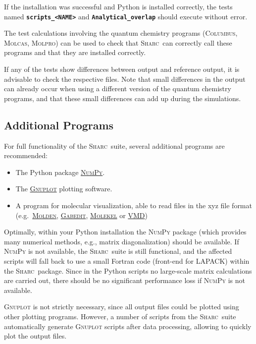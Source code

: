 \documentclass[a4paper,11pt,DIV=15,openany,twoside=false]{scrbook}
\newcommand{\sharc}{\textsc{Sharc}}
\newcommand{\ttt}[1]{\textbf{\texttt{#1}}}
\begin{document}
If the installation was successful and Python is installed correctly, the tests named \ttt{scripts\_<NAME>} and \ttt{Analytical\_overlap} should execute without error. 

The test calculations involving the quantum chemistry programs (\textsc{Columbus}, \textsc{Molcas}, \textsc{Molpro}) can be used to check that \sharc\ can correctly call these programs and that they are installed correctly.

If any of the tests show differences between output and reference output, it is advisable to check the respective files. Note that small differences in the output can already occur when using a different version of the quantum chemistry programs, and that these small differences can add up during the simulations.

\subsection{Additional Programs}

For full functionality of the \sharc\ suite, several additional programs are recommended:
\begin{itemize}
  \item The Python package \href{http://www.numpy.org/}{\textsc{NumPy}}.
  \item The \href{http://www.gnuplot.info/}{\textsc{Gnuplot}} plotting software.
  \item A program for molecular visualization, able to read files in the xyz file format (e.g.\ \href{http://www.cmbi.ru.nl/molden/molden.html}{\textsc{Molden}}, \href{http://gabedit.sourceforge.net/}{\textsc{Gabedit}}, \href{http://molekel.cscs.ch/wiki/pmwiki.php}{\textsc{Molekel}} or \href{http://www.ks.uiuc.edu/Research/vmd/}{VMD})
\end{itemize}

Optimally, within your Python installation the \textsc{NumPy} package (which provides many numerical methods, e.g., matrix diagonalization) should be available. If \textsc{NumPy} is not available, the \sharc\ suite is still functional, and the affected scripts will fall back to use a small Fortran code (front-end for LAPACK) within the \sharc\ package. Since in the Python scripts no large-scale matrix calculations are carried out, there should be no significant performance loss if \textsc{NumPy} is not available.

\textsc{Gnuplot} is not strictly necessary, since all output files could be plotted using other plotting programs. However, a number of scripts from the \sharc\ suite automatically generate \textsc{Gnuplot} scripts after data processing, allowing to quickly plot the output files.
\end{document}
